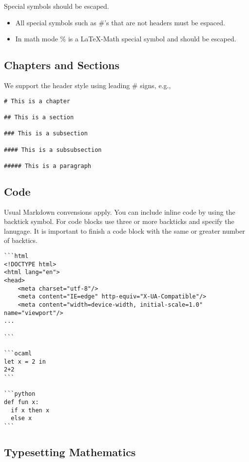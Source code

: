 \begin{important}
Special symbols should be escaped.
\begin{itemize}
\item All special symbols such as \#'s that are not headers must be espaced.
\item In math mode \% is a LaTeX-Math special symbol and should be escaped.
\end{itemize}
\end{important}


\subsection{Chapters and Sections}

We support the header style using leading \# signs, e.g.,
\begin{lstlisting}
# This is a chapter

## This is a section

### This is a subsection

#### This is a subsubsection

##### This is a paragraph
\end{lstlisting}



\subsection{Code}
\label{sec:dc::md::code}

Usual Markdown convensions apply.  You can include inline code by using the backtick symbol. For code blocks use three or more backticks and specify the lanugage. It is important to finish a code block with the same or greater number of backtics.

\begin{example}
\begin{lstlisting}
```html
<!DOCTYPE html>
<html lang="en">
<head>
    <meta charset="utf-8"/>
    <meta content="IE=edge" http-equiv="X-UA-Compatible"/>
    <meta content="width=device-width, initial-scale=1.0" name="viewport"/>
...

```

```ocaml
let x = 2 in
2+2
```

```python
def fun x:
  if x then x
  else x
```
\end{lstlisting}
\end{example} 

\subsection{Typesetting Mathematics}

